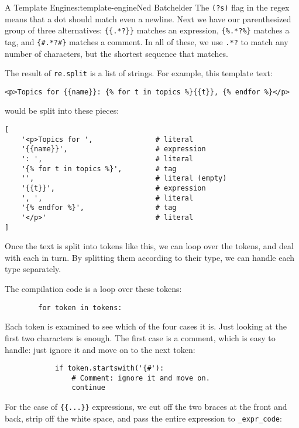 \begin{aosachapter}{A Template Engine}{s:template-engine}{Ned Batchelder}
The \texttt{(?s)} flag in the regex means that a dot should match even a
newline. Next we have our parenthesized group of three alternatives:
\texttt{\{\{.*?\}\}} matches an expression, \texttt{\{\%.*?\%\}} matches
a tag, and \texttt{\{\#.*?\#\}} matches a comment. In all of these, we
use \texttt{.*?} to match any number of characters, but the shortest
sequence that matches.

The result of \texttt{re.split} is a list of strings. For example, this
template text:

\begin{verbatim}
<p>Topics for {{name}}: {% for t in topics %}{{t}}, {% endfor %}</p>
\end{verbatim}

would be split into these pieces:

\begin{verbatim}
[
    '<p>Topics for ',               # literal
    '{{name}}',                     # expression
    ': ',                           # literal
    '{% for t in topics %}',        # tag
    '',                             # literal (empty)
    '{{t}}',                        # expression
    ', ',                           # literal
    '{% endfor %}',                 # tag
    '</p>'                          # literal
]
\end{verbatim}

Once the text is split into tokens like this, we can loop over the
tokens, and deal with each in turn. By splitting them according to their
type, we can handle each type separately.

The compilation code is a loop over these tokens:

\begin{verbatim}
        for token in tokens:
\end{verbatim}

Each token is examined to see which of the four cases it is. Just
looking at the first two characters is enough. The first case is a
comment, which is easy to handle: just ignore it and move on to the next
token:

\begin{verbatim}
            if token.startswith('{#'):
                # Comment: ignore it and move on.
                continue
\end{verbatim}

For the case of \texttt{\{\{...\}\}} expressions, we cut off the two
braces at the front and back, strip off the white space, and pass the
entire expression to \texttt{\_expr\_code}:


\end{aosachapter}
